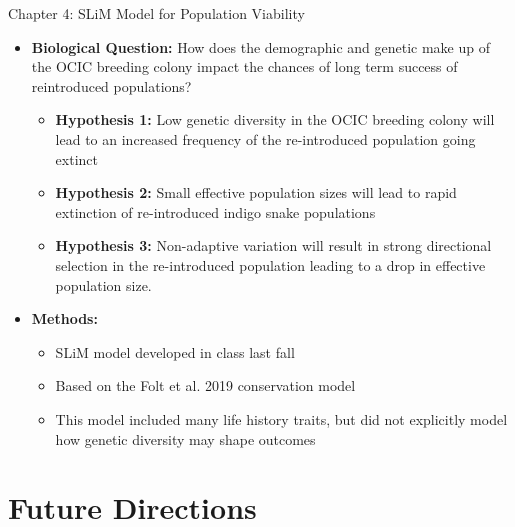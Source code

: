 \documentclass[10pt,aspectratio=169]{beamer}
\begin{document}
\begin{frame}{Chapter 4: SLiM Model for Population Viability}
\begin{itemize}
  \item \textbf{Biological Question:} How does the demographic and genetic make up of the OCIC breeding colony impact the chances of long term success of reintroduced populations?
  \begin{itemize}
    
    \item \textbf{Hypothesis 1:} Low genetic diversity in the OCIC breeding colony will lead to an increased frequency of the re-introduced population going extinct
    \item \textbf{Hypothesis 2:} Small effective population sizes will lead to rapid extinction of re-introduced indigo snake populations
    \item \textbf{Hypothesis 3:} Non-adaptive variation will result in strong directional selection in the re-introduced population leading to a drop in effective population size.
  \end{itemize}
  \item \textbf{Methods:}
    \begin{itemize}
      \item SLiM model developed in class last fall
      \item Based on the Folt et al. 2019 conservation model
      \item This model included many life history traits, but did not explicitly model how genetic diversity may shape outcomes
    \end{itemize}
  \end{itemize}
\end{frame}

\section[Year Goals]{Future Directions}
\end{document}
